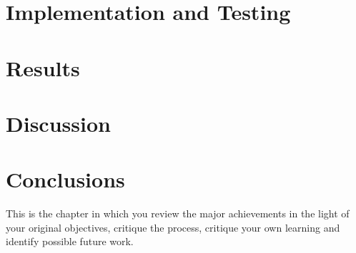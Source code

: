 \documentclass[11pt,openright,twoside,a4paper]{report}
\begin{document}
\chapter{Implementation and Testing}








\chapter{Results}


\chapter{Discussion}


\chapter{Conclusions}


This is the chapter in which you review the major achievements in the
light of your original objectives, critique the process, critique your
own learning and identify possible future work.



\end{document}
